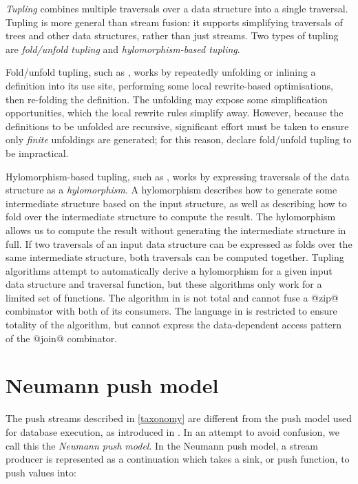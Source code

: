 \emph{Tupling} combines multiple traversals over a data structure into a single traversal.
Tupling is more general than stream fusion: it supports simplifying traversals of trees and other data structures, rather than just streams.
Two types of tupling are \emph{fold/unfold tupling} and \emph{hylomorphism-based tupling}.

Fold/unfold tupling, such as \citet{chiba2010program}, works by repeatedly unfolding or inlining a definition into its use site, performing some local rewrite-based optimisations, then re-folding the definition.
The unfolding may expose some simplification opportunities, which the local rewrite rules simplify away.
However, because the definitions to be unfolded are recursive, significant effort must be taken to ensure only \emph{finite} unfoldings are generated; for this reason, \citet{hu1997tupling} declare fold/unfold tupling to be impractical.

Hylomorphism-based tupling, such as \citet{hu1996cheap}, works by expressing traversals of the data structure as a \emph{hylomorphism}.
A hylomorphism describes how to generate some intermediate structure based on the input structure, as well as describing how to fold over the intermediate structure to compute the result.
The hylomorphism allows us to compute the result without generating the intermediate structure in full.
If two traversals of an input data structure can be expressed as folds over the same intermediate structure, both traversals can be computed together.
Tupling algorithms attempt to automatically derive a hylomorphism for a given input data structure and traversal function, but these algorithms only work for a limited set of functions.
The algorithm in \citet{launchbury1995warm} is not total and cannot fuse a @zip@ combinator with both of its consumers.
The language in \citet{hu1996deriving} is restricted to ensure totality of the algorithm, but cannot express the data-dependent access pattern of the @join@ combinator.


\section{Neumann push model}
\label{related/push-model}

The push streams described in \cref{taxonomy} are different from the push model used for database execution, as introduced in \citet{neumann2011efficiently}.
In an attempt to avoid confusion, we call this the \emph{Neumann push model}.
In the Neumann push model, a stream producer is represented as a continuation which takes a sink, or push function, to push values into:

